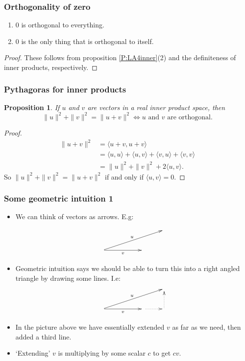 \documentclass[handout]{beamer}
\newtheorem{proposition}[theorem]{Proposition}
\begin{document}
\begin{frame}
\frametitle{Orthogonality of zero}
\begin{lemma}\mbox{}
\begin{enumerate}
\item $0$ is orthogonal to everything.
\item $0$ is the only thing that is orthogonal to itself.
\end{enumerate}
\end{lemma}
\begin{proof}
These follows from proposition \ref{P:LA4inner}(2) and the definiteness of inner products, respectively.
\end{proof}
\end{frame}

\begin{frame}
\frametitle{Pythagoras for inner products}
\begin{proposition}\label{P:LA4pythag}
If $u$ and $v$ are vectors in a real inner product space, then
\[\|u\|^2+\|v\|^2 = \|u+v\|^2 \iff u\text{ and } v \text{ are orthogonal}.\]
\end{proposition}
\begin{proof}
\center {}
\begin{align*}
\|u+v\|^2 &= \langle u+v, u+v\rangle \\
&= \langle u, u \rangle + \langle u, v \rangle + \langle v,u \rangle + \langle v,v \rangle \\
&= \|u\|^2+\|v\|^2 + 2\langle u, v\rangle. 
\end{align*}
So $\|u\|^2+\|v\|^2 = \|u+v\|^2$ if and only if $\langle u, v\rangle = 0$.
\end{proof}
\end{frame}

\begin{frame}
\frametitle{Some geometric intuition 1}
\begin{itemize}
\item We can think of vectors as arrows. E.g: 

\[\xymatrix{ & & & \\
\ar[rrru]^u\ar[rr]_v & & 
}\] 

\item Geometric intuition says we should be able to turn this into a right angled triangle by drawing some lines. I.e:
\[\xymatrix{ & & & \\
\ar[rrru]^u\ar[rr]_v & &\ar@{.>}[r] &\ar@{.>}[u]
}\]
\item In the picture above we have essentially extended $v$ as far as we need, then added a third line. 
\item `Extending' $v$ is multiplying by some scalar $c$ to get $cv$. 
\end{itemize}
\end{frame}
\end{document}

